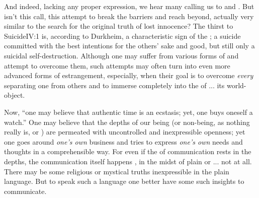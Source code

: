 And indeed, lacking any proper expression, we hear many calling us to  and . But
isn't this call, this attempt to break the barriers and reach beyond, actually
very similar to the search for the original truth of lost innocence? The thirst
to \citet{get rid of one's personal ego and become embraced by the otherness
  which one believes to be one's essence}{Suicide}{IV:1 } is,
according to Durkheim, a characteristic sign of the ; a suicide committed with the best intentions for the others' sake and
  good, but still only a suicidal self-destruction. Although one may suffer from
  various forms of  and 
attempt to overcome them, such attempts may often turn into even more advanced forms
of estrangement, especially, when their goal is to  overcome {\em every} 
  separating one from others and  to immerse  completely 
 into the  of ... its world-object. 

\pa 
Now, ``one may believe that authentic time is an ecstasis; 
yet, one buys oneself a watch.'' One may believe that the depths of 
our being (or non-being, as nothing really is, or 
%
%
) are permeated with uncontrolled and inexpressible openness; yet
one goes around {\em one's own} business and tries to express {\em one's own}
needs and thoughts in a comprehensible way. For even if the  of
communication rests in the  depths, the communication itself
happens , in the midst of plain  or ... not at
all. There may be some religious or 
mystical truths inexpressible in the plain language. But to speak such a language
one better have some such insights to communicate.

